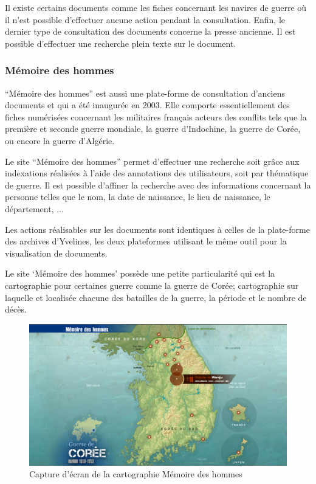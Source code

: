         Il existe certains documents comme les fiches concernant les navires de guerre où il n’est possible d’effectuer aucune
        action pendant la consultation. Enfin, le dernier type de consultation des documents concerne la presse ancienne.
        Il est possible d’effectuer une recherche plein texte sur le document.

        \subsubsection{Mémoire des hommes}
        \label{subsubsec:memoire}
        “Mémoire des hommes” est aussi une plate-forme de consultation d’anciens documents et qui a été inaugurée en 2003.
        Elle comporte essentiellement des fiches numérisées concernant les militaires français acteurs des conflits tels
        que la première et seconde guerre mondiale, la guerre d’Indochine, la guerre de Corée, ou encore la guerre d’Algérie.

        Le site “Mémoire des hommes” permet d’effectuer une recherche soit grâce aux indexations réalisées à l’aide des
        annotations des utilisateurs, soit par thématique de guerre. Il est possible d’affiner la recherche avec des
        informations concernant la personne telles que le nom, la date de naissance, le lieu de naissance, le département, ...

        Les actions réalisables sur les documents sont identiques à celles de la plate-forme des archives d’Yvelines,
        les deux plateformes utilisant le même outil pour la visualisation de documents.

        Le site ‘Mémoire des hommes’ possède une petite particularité qui est la cartographie pour certaines guerre comme
        la guerre de Corée;  cartographie sur laquelle et localisée chacune des batailles de la guerre, la période et le nombre de décès.

        \begin{figure}[ht!]
            \centering
            \includegraphics[width=1\textwidth]{figure/screen_memoire_hommes.png}
            \caption{Capture d'écran de la cartographie Mémoire des hommes}
            \label{fig:memoire_hommes}
        \end{figure}

